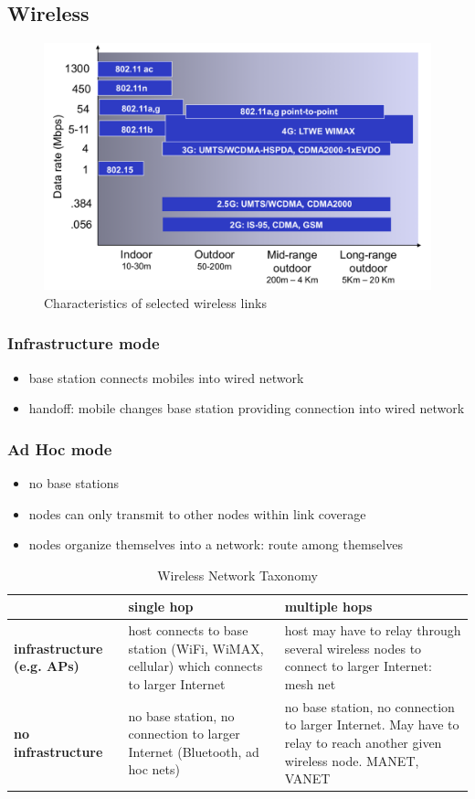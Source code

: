\subsection{Wireless}
\begin{figure}[H]
	\includegraphics[width=\linewidth]{wifi}
	\centering
	\caption{Characteristics of selected wireless links}
\end{figure}
\subsubsection{Infrastructure mode}
\begin{itemize}
	\item base station connects mobiles into wired network
	\item handoff: mobile changes base station providing connection into wired network
\end{itemize}
\subsubsection{Ad Hoc mode}
\begin{itemize}
	\item no base stations
	\item nodes can only transmit to other nodes within link coverage
	\item nodes organize themselves into a network: route among themselves
\end{itemize}
\begin{table}[H]
	\centering
	\caption{Wireless Network Taxonomy}
	\begin{tabular}{p{2.5cm}|p{3cm}p{3cm}}
		\toprule
		&\textbf{single hop} & \textbf{multiple hops}\\
		\midrule
		\textbf{infrastructure (e.g. APs)} & host connects to base station (WiFi, WiMAX, cellular) which connects to larger Internet & host may have to relay through several wireless nodes to connect to larger Internet: mesh net\\
		\midrule
		\textbf{no infrastructure} & no base station, no connection to larger Internet (Bluetooth, ad hoc nets) & no base station, no connection to larger Internet. May have to relay to reach another given wireless node. MANET, VANET\\
		\bottomrule
	\end{tabular}
\end{table}
